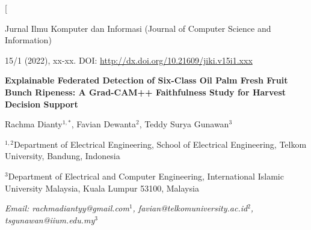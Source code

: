 \documentclass[9pt,twocolumn]{extarticle}
\begin{document}
\twocolumn[
  \begin{center}
  \begin{minipage}{0.94\textwidth}
  \centering
    {\small Jurnal Ilmu Komputer dan Informasi (Journal of Computer Science and Information)\par
    15/1 (2022), xx-xx. DOI: \url{http://dx.doi.org/10.21609/jiki.v15i1.xxx}\par}
    \vspace{1.2em}
    {\LARGE\bfseries Explainable Federated Detection of Six-Class Oil Palm Fresh Fruit Bunch Ripeness: A Grad-CAM++ Faithfulness Study for Harvest Decision Support\par}
    \vspace{1em}
    {\large Rachma Dianty$^{1,*}$, Favian Dewanta$^2$, Teddy Surya Gunawan$^3$\par}
    \vspace{0.4em}
    {\small $^{1,2}$Department of Electrical Engineering, School of Electrical Engineering, Telkom University, Bandung, Indonesia\par
    $^3$Department of Electrical and Computer Engineering, International Islamic University Malaysia, Kuala Lumpur 53100, Malaysia\par}
    \vspace{0.4em}
    {\small\itshape Email: rachmadiantyy@gmail.com$^1$, favian@telkomuniversity.ac.id$^2$, tsgunawan@iium.edu.my$^3$\par}
  \end{minipage}
  \end{center}
  \vspace{1em}
\end{document}
